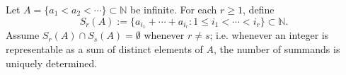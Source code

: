 Let \(A=\{a_1<a_2<\cdots\}\subset\mathbb{N}\) be infinite.
For each \(r\ge1\), define
\[
  S_r(A) := \{a_{i_1}+\cdots+a_{i_r} : 1\le i_1<\cdots<i_r\}\subset\mathbb{N}.
\]
Assume \(S_r(A)\cap S_s(A)=\emptyset\) whenever \(r\neq s\); i.e. whenever an integer is representable
as a sum of distinct elements of \(A\), the number of summands is uniquely determined.
